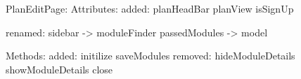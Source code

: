 PlanEditPage:
Attributes:
	added:
		planHeadBar
		planView
		isSignUp

	renamed: 
		sidebar -> moduleFinder
		passedModules -> model


Methods:
	added:
		initilize
		saveModules
	removed:
		hideModuleDetails
		showModuleDetails
		close

